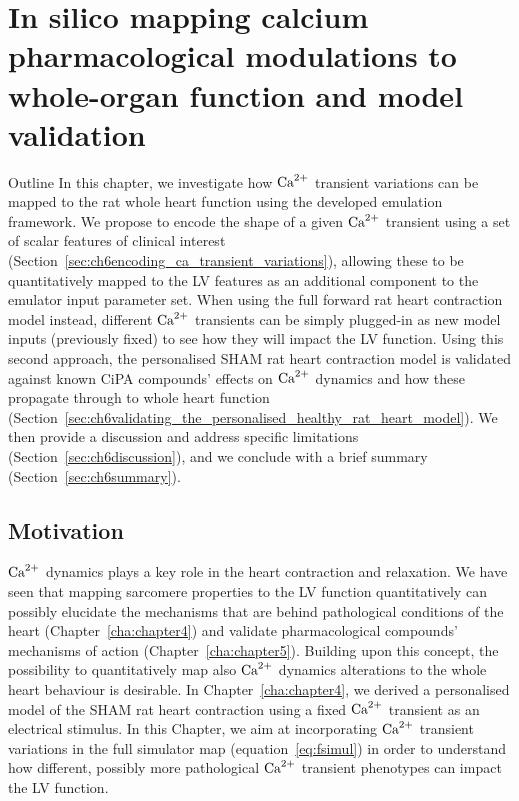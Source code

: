 \chapter{In silico mapping calcium pharmacological modulations to whole-organ function and model validation}\label{cha:chapter6}
%
%
%
\begin{remark}{Outline}
    In this chapter, we investigate how $\textrm{Ca}^{2+}$ transient variations can be mapped to the rat whole heart function using the developed emulation framework. We propose to encode the shape of a given $\textrm{Ca}^{2+}$ transient using a set of scalar features of clinical interest (Section~\ref{sec:ch6encoding_ca_transient_variations}), allowing these to be quantitatively mapped to the LV features as an additional component to the emulator input parameter set. When using the full forward rat heart contraction model instead, different $\textrm{Ca}^{2+}$ transients can be simply plugged-in as new model inputs (previously fixed) to see how they will impact the LV function. Using this second approach, the personalised SHAM rat heart contraction model is validated against known CiPA compounds' effects on $\textrm{Ca}^{2+}$ dynamics and how these propagate through to whole heart function (Section~\ref{sec:ch6validating_the_personalised_healthy_rat_heart_model}). We then provide a discussion and address specific limitations (Section~\ref{sec:ch6discussion}), and we conclude with a brief summary (Section~\ref{sec:ch6summary}).
\end{remark}


%
%
%
\section{Motivation}\label{sec:ch6motivation}
$\textrm{Ca}^{2+}$ dynamics plays a key role in the heart contraction and relaxation. We have seen that mapping sarcomere properties to the LV function quantitatively can possibly elucidate the mechanisms that are behind pathological conditions of the heart (Chapter~\ref{cha:chapter4}) and validate pharmacological compounds' mechanisms of action (Chapter~\ref{cha:chapter5}). Building upon this concept, the possibility to quantitatively map also $\textrm{Ca}^{2+}$ dynamics alterations to the whole heart behaviour is desirable. In Chapter~\ref{cha:chapter4}, we derived a personalised model of the SHAM rat heart contraction using a fixed $\textrm{Ca}^{2+}$ transient as an electrical stimulus. In this Chapter, we aim at incorporating $\textrm{Ca}^{2+}$ transient variations in the full simulator map (equation~\ref{eq:fsimul}) in order to understand how different, possibly more pathological $\textrm{Ca}^{2+}$ transient phenotypes can impact the LV function.


